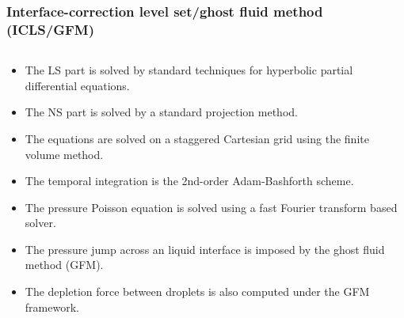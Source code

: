 \begin{frame}[noframenumbering]
\begin{columns}
    \begin{column}{0.2\textwidth}
    \end{column}
  \end{columns}

\end{frame}
\begin{frame}[noframenumbering]
  \frametitle{Interface-correction level set/ghost fluid method (ICLS/GFM)}

  \begin{columns}
    
    \begin{column}{0.9\textwidth}
      
      \begin{bluecolorbox}
        \medskip
        \begin{itemize}
        \item The LS part is solved by standard techniques for hyperbolic partial differential equations. \medskip
        \item The NS part is solved by a standard projection method. \medskip
        \item The equations are solved on a staggered Cartesian grid using the finite volume method. \medskip
        \item The temporal integration is the 2nd-order Adam-Bashforth scheme. \medskip
        \item The pressure Poisson equation is solved using a fast Fourier transform based solver. \medskip
        \item The pressure jump across an liquid interface is imposed by the ghost fluid method (GFM). \medskip
        \item The depletion force between droplets is also computed under the GFM framework. \medskip
        \end{itemize}
      \end{bluecolorbox}
       
    \end{column}
    
  \end{columns}

  \vskip0.5cm
  \pause
  \centering
  
\end{frame}


